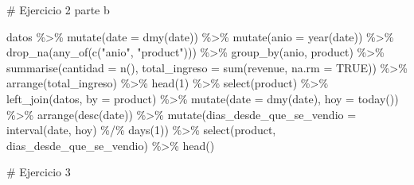 \documentclass[
  letterpaper,
  DIV=11,
  numbers=noendperiod]{scrreprt}
\newenvironment{Shaded}{\begin{snugshade}}{\end{snugshade}}
\newcommand{\AttributeTok}[1]{\textcolor[rgb]{0.40,0.45,0.13}{#1}}
\newcommand{\CommentTok}[1]{\textcolor[rgb]{0.37,0.37,0.37}{#1}}
\newcommand{\ConstantTok}[1]{\textcolor[rgb]{0.56,0.35,0.01}{#1}}
\newcommand{\DecValTok}[1]{\textcolor[rgb]{0.68,0.00,0.00}{#1}}
\newcommand{\FunctionTok}[1]{\textcolor[rgb]{0.28,0.35,0.67}{#1}}
\newcommand{\NormalTok}[1]{\textcolor[rgb]{0.00,0.23,0.31}{#1}}
\newcommand{\SpecialCharTok}[1]{\textcolor[rgb]{0.37,0.37,0.37}{#1}}
\newcommand{\StringTok}[1]{\textcolor[rgb]{0.13,0.47,0.30}{#1}}
\begin{document}
\begin{Shaded}
\begin{Highlighting}[]
\CommentTok{\# Ejercicio 2 parte b}

\NormalTok{datos }\SpecialCharTok{\%\textgreater{}\%} 
  \FunctionTok{mutate}\NormalTok{(}\AttributeTok{date =} \FunctionTok{dmy}\NormalTok{(date)) }\SpecialCharTok{\%\textgreater{}\%} 
  \FunctionTok{mutate}\NormalTok{(}\AttributeTok{anio =} \FunctionTok{year}\NormalTok{(date)) }\SpecialCharTok{\%\textgreater{}\%} 
  \FunctionTok{drop\_na}\NormalTok{(}\FunctionTok{any\_of}\NormalTok{(}\FunctionTok{c}\NormalTok{(}\StringTok{"anio"}\NormalTok{, }\StringTok{"product"}\NormalTok{))) }\SpecialCharTok{\%\textgreater{}\%} 
  \FunctionTok{group\_by}\NormalTok{(anio, product) }\SpecialCharTok{\%\textgreater{}\%} 
  \FunctionTok{summarise}\NormalTok{(}\AttributeTok{cantidad =} \FunctionTok{n}\NormalTok{(), }\AttributeTok{total\_ingreso =} \FunctionTok{sum}\NormalTok{(revenue, }\AttributeTok{na.rm =} \ConstantTok{TRUE}\NormalTok{)) }\SpecialCharTok{\%\textgreater{}\%} 
  \FunctionTok{arrange}\NormalTok{(total\_ingreso) }\SpecialCharTok{\%\textgreater{}\%} 
  \FunctionTok{head}\NormalTok{(}\DecValTok{1}\NormalTok{) }\SpecialCharTok{\%\textgreater{}\%} 
  \FunctionTok{select}\NormalTok{(product) }\SpecialCharTok{\%\textgreater{}\%} 
  \FunctionTok{left\_join}\NormalTok{(datos, }\AttributeTok{by =} \StringTok{\textquotesingle{}product\textquotesingle{}}\NormalTok{) }\SpecialCharTok{\%\textgreater{}\%} 
  \FunctionTok{mutate}\NormalTok{(}\AttributeTok{date =} \FunctionTok{dmy}\NormalTok{(date), }\AttributeTok{hoy =} \FunctionTok{today}\NormalTok{()) }\SpecialCharTok{\%\textgreater{}\%} 
  \FunctionTok{arrange}\NormalTok{(}\FunctionTok{desc}\NormalTok{(date)) }\SpecialCharTok{\%\textgreater{}\%} 
  \FunctionTok{mutate}\NormalTok{(}\AttributeTok{dias\_desde\_que\_se\_vendio =} \FunctionTok{interval}\NormalTok{(date, hoy) }\SpecialCharTok{\%/\%} \FunctionTok{days}\NormalTok{(}\DecValTok{1}\NormalTok{)) }\SpecialCharTok{\%\textgreater{}\%} 
  \FunctionTok{select}\NormalTok{(product, dias\_desde\_que\_se\_vendio) }\SpecialCharTok{\%\textgreater{}\%} 
  \FunctionTok{head}\NormalTok{()}

\CommentTok{\# Ejercicio 3}


\end{Highlighting}
\end{Shaded}
\end{document}
